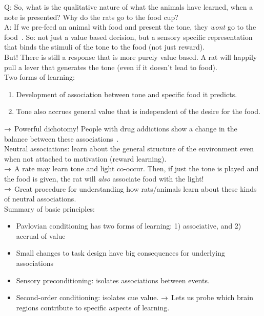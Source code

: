 Q: So, what is the qualitative nature of what the animals have learned, when a note is presented? Why do the rats go to the food cup? \\

A: If we pre-feed an animal with food and present the tone, they {\it wont} go to the food~\cite{rescorla1982behavioral}. So: not just a value based decision, but a sensory specific representation that binds the stimuli of the tone to the food (not just reward). \\

But! There is still a response that is more purely value based. A rat will happily pull a lever that generates the tone (even if it doesn't lead to food). \\

Two forms of learning:
\begin{enumerate}
    \item Development of association between tone and specific food it predicts.
    \item Tone also accrues general value that is independent of the desire for the food.
\end{enumerate}

$\rightarrow$ Powerful dichotomy! People with drug addictions show a change in the balance between these associations~\cite{everitt2005neural}. \\

Neutral associations: learn about the general structure of the environment even when not attached to motivation (reward learning). \\

$\rightarrow$ A rate may learn tone and light co-occur. Then, if just the tone is played and the food is given, the rat will {\it also} associate food with the light! \\

$\rightarrow$ Great procedure for understanding how rats/animals learn about these kinds of neutral associations. \\

Summary of basic principles:
\begin{itemize}
    \item Pavlovian conditioning has two forms of learning: 1) associative, and 2) accrual of value
    \item Small changes to task design have big consequences for underlying associations
    \item Sensory preconditioning: isolates associations between events.
    \item Second-order conditioning: isolates cue value.
    $\rightarrow$ Lets us probe which brain regions contribute to specific aspects of learning.
\end{itemize}

